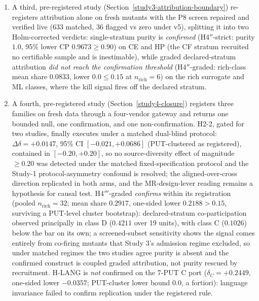 \documentclass[manuscript,screen,review]{acmart}
\begin{document}
\begin{enumerate}
  powered successors on a blind-authored 28-PUT grid, executed once. Three
  confirm: H1\('\) (5/5 families clear \(\geq 8/28\)); H2-1\('\)
  (\(\delta = +0.4295\), PUT-cluster one-sided 95\% lower \(+0.2777\),
  directional, not large); and H3\('\) (3/4 classes, class C negative). Attribution purity H4\('\)
  is \emph{not} confirmed (mean \texttt{suspect\_share} 0.1714 vs a 0.05 bar):
  multi-stratum leakage generalises beyond the Study-1 CF/TF diagnosis (TF
  72/135, OS 27/123) once the grid widens. The cross-vendor hypothesis is gated
  not-run under the same-vendor harness.
\item
  A third, pre-registered study (Section~\ref{study3-attribution-boundary})
  re-registers attribution alone on fresh mutants with the P8 screen repaired
  and verified live (633 matched, 36 flagged vs zero under v5), splitting it into
  two Holm-corrected verdicts: single-stratum purity is \emph{confirmed}
  (H4\('' \)-strict: purity \(1.0\), 95\% lower CP \(0.9673 \geq 0.90\)) on
  CE and HP (the CF stratum recruited no certifiable sample and is
  inestimable), while graded declared-stratum attribution \emph{did not reach
  the confirmation threshold} (H4\('' \)-graded: rich-class mean share
  \(0.0833\), lower \(0.0 \leq 0.15\) at \(n_{\mathrm{rich}} = 6\)) on the
  rich surrogate and ML classes, where the kill signal
  fires off the declared stratum.
\item
  A fourth, pre-registered study (Section~\ref{study4-closure}) registers three
  families on fresh data through a four-vendor gateway and returns one bounded
  null, one confirmation, and one non-confirmation. H2-2, gated for two studies,
  finally executes under a matched dual-blind protocol:
  \(\Delta\delta = +0.0147\), 95\% CI \([-0.021, +0.0686]\) (PUT-clustered as
  registered), contained in \([-0.20, +0.20]\), so no source-diversity effect
  of magnitude \(\geq 0.20\) was detected under the matched
  fixed-specification protocol and the Study-1 protocol-asymmetry confound is
  resolved; the aligned-over-cross direction replicated in both arms, and the
  MR-design-lever reading remains a hypothesis for causal test.
  H4\('''\)-graded \emph{confirms} within its registration (pooled
  \(n_{\mathrm{rich}} = 32\); mean share \(0.2917\), one-sided lower
  \(0.2188 > 0.15\), surviving a PUT-level cluster bootstrap):
  declared-stratum co-participation observed principally in class D
  (\(0.4211\) over 19 units), with class C (\(0.1026\)) below the bar on its
  own; a screened-subset sensitivity shows
  the signal comes entirely from co-firing mutants that Study 3's admission
  regime excluded, so under matched regimes the two studies agree purity is
  absent and the confirmed construct is coupled graded attribution, not
  purity rescued by recruitment. H-LANG is
  \emph{not} confirmed on the 7-PUT C port (\(\delta_C = +0.2449\), one-sided
  lower \(-0.0357\); PUT-cluster lower bound \(0.0\), a fortiori):
  language invariance failed to confirm replication
  under the registered rule.
\end{enumerate}
\end{document}
